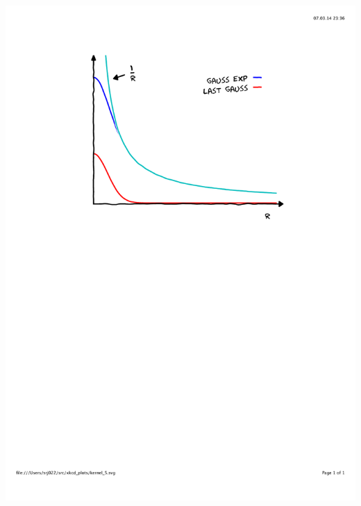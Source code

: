 \begin{frame}
\begin{columns}
\begin{column}{.50\textwidth}
{        \includegraphics[scale=0.4, clip, viewport = 110 450 490 800]
            {figures/kernel_5.pdf}}
\end{column}
\end{columns}
\end{frame}

